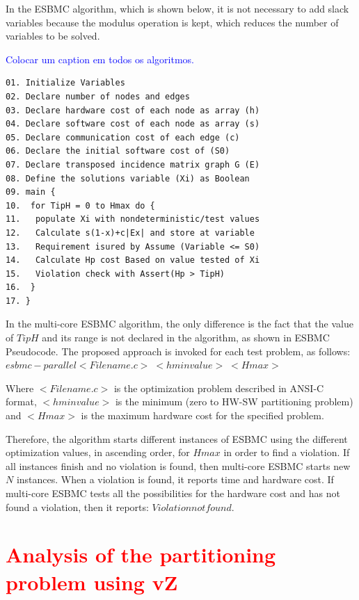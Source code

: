 In the ESBMC algorithm, which is shown below, it is not necessary to add slack variables because the modulus operation is kept, which reduces the number of variables to be solved. 

\textcolor{blue}{Colocar um caption em todos os algoritmos.}

\begin{lstlisting}[caption=Pseudocode describing ESBMC]
01. Initialize Variables 
02. Declare number of nodes and edges
03. Declare hardware cost of each node as array (h)
04. Declare software cost of each node as array (s)
05. Declare communication cost of each edge (c)
06. Declare the initial software cost of (S0)
07. Declare transposed incidence matrix graph G (E)
08. Define the solutions variable (Xi) as Boolean
09. main {
10.  for TipH = 0 to Hmax do {
11.   populate Xi with nondeterministic/test values
12.   Calculate s(1-x)+c|Ex| and store at variable
13.   Requirement isured by Assume (Variable <= S0)
14.   Calculate Hp cost Based on value tested of Xi
15.   Violation check with Assert(Hp > TipH)
16.  }
17. }
\end{lstlisting}

In the multi-core ESBMC algorithm, the only difference is the fact that the value of $ TipH $ and its range is not declared in the algorithm, as shown in ESBMC Pseudocode. The proposed approach is invoked for each test problem, as follows:
$ esbmc-parallel <Filename.c> \; <hminvalue> \; <Hmax> $

Where $ <Filename.c> $ is the optimization problem described in ANSI-C format, $  <hminvalue> $ is the minimum (zero to HW-SW partitioning problem) and $ <Hmax> $ is the maximum hardware cost for the specified problem.

Therefore, the algorithm starts  different instances of ESBMC using the different optimization values, in ascending order, for $ Hmax $ in order to find a violation. If all instances finish and no violation is found, then multi-core ESBMC starts new $ N $ instances. When a violation is found, it reports time and hardware cost. If multi-core ESBMC tests all the possibilities for the hardware cost and has not found a violation, then it reports: $ Violation not found $.

\section{\textcolor{Red}{Analysis of the partitioning problem using vZ}}


